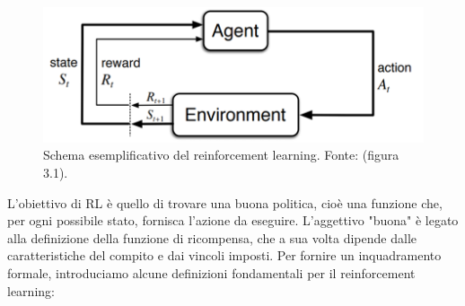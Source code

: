 \begin{figure}[h]
    \centering
    \includegraphics[width=0.4\linewidth]{immagini/reinforcement_learning_scheme.png}
    \caption{Schema esemplificativo del reinforcement learning. Fonte: \cite{sutton2018reinforcement}(figura 3.1).}
    \label{fig:rl_schema} 
\end{figure}

L'obiettivo di RL è quello di trovare una buona politica, cioè una funzione che, per ogni possibile stato, fornisca l'azione da eseguire. L'aggettivo "buona" è legato alla definizione della funzione di ricompensa, che a sua volta dipende dalle caratteristiche del compito e dai vincoli imposti. Per fornire un inquadramento formale, introduciamo alcune definizioni fondamentali per il reinforcement learning:
